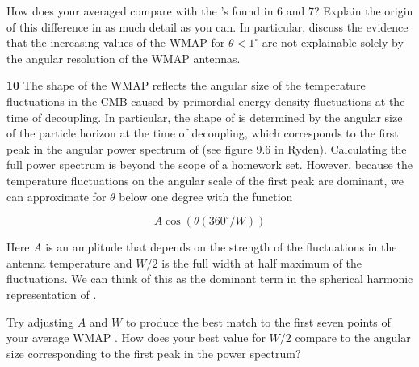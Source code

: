 \documentclass[12pt]{article}
\begin{document}
How does your averaged \ct compare with the \ct's found in 6 and 7? Explain the origin of this difference in as much detail as you can. In particular, discuss the evidence that the increasing values of the WMAP \ct for \( \theta < 1^\circ\) are not explainable solely by the angular resolution of the WMAP antennas.

\textbf{10} The shape of the WMAP \ct reflects the angular size of the temperature fluctuations in the CMB caused by primordial energy density fluctuations at the time of decoupling. In particular, the shape of \ct is determined by the angular size of the particle horizon at the time of decoupling, which corresponds to the first peak in the angular power spectrum of \ct (see figure 9.6 in Ryden). Calculating the full power spectrum is beyond the scope of a homework set. However, because the temperature fluctuations on the angular scale of the first peak are dominant, we can approximate \ct for \(\theta\) below one degree with the function

\[A\cos(\theta(360^\circ/W))
\] 

Here \(A\) is an amplitude that depends on the strength of the fluctuations in the antenna temperature and \(W/2\) is the full width at half maximum of the fluctuations. We can think of this as the dominant term in the spherical harmonic representation of \ct.

Try adjusting \(A\) and \(W\) to produce the best match to the first seven points of your average WMAP \ct. How does your best value for \(W/2\) compare to the angular size corresponding to the first peak in the power spectrum?
\end{document}
